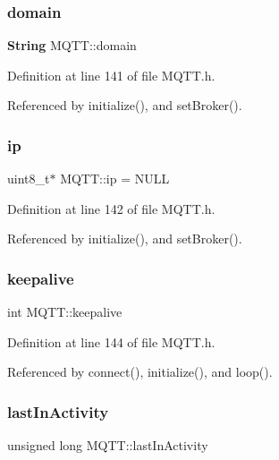 \mbox{\label{class_m_q_t_t_a36cef0e2c168c4ce68dda653df6e3be1}} 
\subsubsection{domain}
{\footnotesize\ttfamily \textbf{ String} M\+Q\+T\+T\+::domain\hspace{0.3cm}{\ttfamily [private]}}



Definition at line 141 of file M\+Q\+T\+T.\+h.



Referenced by initialize(), and set\+Broker().

\mbox{\label{class_m_q_t_t_a70618323bb75b467ed054dd191397b37}} 
\subsubsection{ip}
{\footnotesize\ttfamily uint8\+\_\+t$\ast$ M\+Q\+T\+T\+::ip = N\+U\+LL\hspace{0.3cm}{\ttfamily [private]}}



Definition at line 142 of file M\+Q\+T\+T.\+h.



Referenced by initialize(), and set\+Broker().

\mbox{\label{class_m_q_t_t_af93aeb459130c36b2a8d894011f10492}} 
\subsubsection{keepalive}
{\footnotesize\ttfamily int M\+Q\+T\+T\+::keepalive\hspace{0.3cm}{\ttfamily [private]}}



Definition at line 144 of file M\+Q\+T\+T.\+h.



Referenced by connect(), initialize(), and loop().

\mbox{\label{class_m_q_t_t_a0a5d8f29e0e75772e0a85b109fa77a04}} 
\subsubsection{last\+In\+Activity}
{\footnotesize\ttfamily unsigned long M\+Q\+T\+T\+::last\+In\+Activity\hspace{0.3cm}{\ttfamily [private]}}



